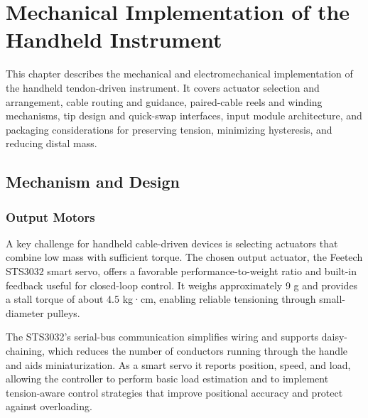 





\chapter{Mechanical Implementation of the Handheld Instrument} %
\label{Chapter8}
\begin{chaptersummary}
This chapter describes the mechanical and electromechanical implementation of the handheld tendon-driven instrument. It covers actuator selection and arrangement, cable routing and guidance, paired-cable reels and winding mechanisms, tip design and quick-swap interfaces, input module architecture, and packaging considerations for preserving tension, minimizing hysteresis, and reducing distal mass.
\end{chaptersummary}
\section{Mechanism and Design}
\subsection{Output Motors}
A key challenge for handheld cable-driven devices is selecting actuators that combine low mass with sufficient torque. The chosen output actuator, the Feetech STS3032 smart servo, offers a favorable performance-to-weight ratio and built-in feedback useful for closed-loop control. It weighs approximately 9 g and provides a stall torque of about 4.5 kg·cm, enabling reliable tensioning through small-diameter pulleys.

The STS3032's serial-bus communication simplifies wiring and supports daisy-chaining, which reduces the number of conductors running through the handle and aids miniaturization. As a smart servo it reports position, speed, and load, allowing the controller to perform basic load estimation and to implement tension-aware control strategies that improve positional accuracy and protect against overloading.

